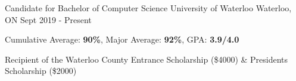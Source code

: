 
\begin{cventries}
  \cventry
    {Candidate for Bachelor of Computer Science} %
    {University of Waterloo} %
    {Waterloo, ON} %
    {Sept 2019 - Present} %
    {
      \begin{cvitems} %
        \item{Cumulative Average: \textbf{90\%}, Major Average: \textbf{92\%}, GPA: \textbf{3.9/4.0}}
        \item {Recipient of the Waterloo County Entrance Scholarship (\$4000) \& President\textquotesingle s Scholarship (\$2000)}
      \end{cvitems}
    }
\end{cventries}
